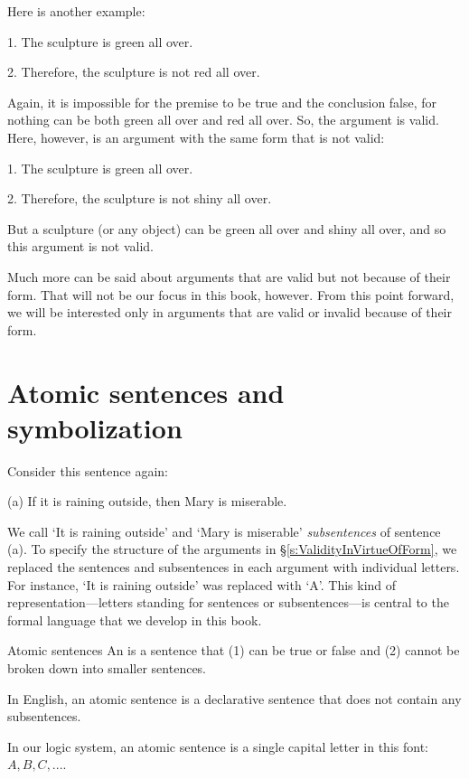 Here is another example:
	\begin{earg}
		\item[1.] The sculpture is green all over.
		\item[2.] Therefore, the sculpture is not red all over. 
	\end{earg}
Again, it is impossible for the premise to be true and the conclusion false, for nothing can be both green all over and red all over. So, the argument is valid. Here, however, is an argument with the same form that is not valid:
	\begin{earg}
		\item[1.] The sculpture is green all over.
		\item[2.] Therefore, the sculpture is not shiny all over.
	\end{earg}
But a sculpture (or any object) can be green all over and shiny all over, and so this argument is not valid. 

Much more can be said about arguments that are valid but not because of their form. That will not be our focus in this book, however. From this point forward, we will be interested only in arguments that are valid or invalid because of their form.


\section{Atomic sentences and symbolization}\label{s:atomic}

Consider this sentence again:
	\begin{earg}
		\item[(a)] If it is raining outside, then Mary is miserable.
	\end{earg}
We call `It is raining outside' and `Mary is miserable' \textit{subsentences} of sentence (a). To specify the structure of the arguments in \S\ref{s:ValidityInVirtueOfForm}, we replaced the sentences and subsentences in each argument with individual letters. For instance, `It is raining outside' was replaced with `A'. This kind of representation---letters standing for sentences or subsentences---is central to the formal language that we develop in this book.

\begin{factboxy}{Atomic sentences}
An  is a sentence that (1) can be true or false and (2) cannot be broken down into smaller sentences.\medskip

In English, an atomic sentence is a declarative sentence that does not contain any subsentences.\smallskip

In our logic system, an atomic sentence is a single capital letter in this font: $A, B, C, . . .$.
\end{factboxy}

